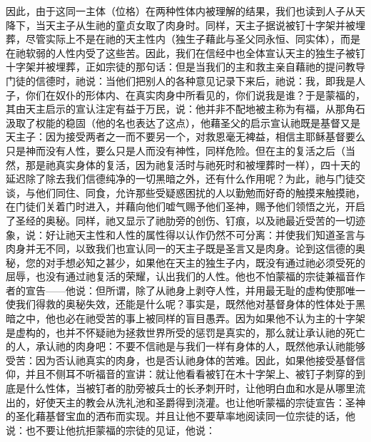 因此，由于这同一主体（位格）在两种性体内被理解的结果，我们也读到人子从天降下，当天主子从生祂的童贞女取了肉身时。同样，天主子据说被钉十字架并被埋葬，尽管实际上不是在祂的天主性内（独生子藉此与圣父同永恒、同实体），而是在祂软弱的人性内受了这些苦。因此，我们在信经中也全体宣认天主的独生子被钉十字架并被埋葬，正如宗徒的那句话：但是当我们的主和救主亲自藉祂的提问教导门徒的信德时，祂说：当他们把别人的各种意见记录下来后，祂说：我，即我是人子，你们在奴仆的形体内、在真实肉身中所看见的，你们说我是谁？于是蒙福的，其由天主启示的宣认注定有益于万民，说：他并非不配地被主称为有福，从那角石汲取了权能的稳固（他的名也表达了这点），他藉圣父的启示宣认祂既是基督又是天主子：因为接受两者之一而不要另一个，对救恩毫无裨益，相信主耶稣基督要么只是神而没有人性，要么只是人而没有神性，同样危险。但在主的复活之后（当然，那是祂真实身体的复活，因为祂复活时与祂死时和被埋葬时一样），四十天的延迟除了除去我们信德纯净的一切黑暗之外，还有什么作用呢？为此，祂与门徒交谈，与他们同住、同食，允许那些受疑惑困扰的人以勤勉而好奇的触摸来触摸祂，在门徒们关着门时进入，并藉向他们嘘气赐予他们圣神，赐予他们领悟之光，开启了圣经的奥秘。同样，祂又显示了祂肋旁的创伤、钉痕，以及祂最近受苦的一切迹象，说：好让祂天主性和人性的属性得以认作仍然不可分离：并使我们知道圣言与肉身并无不同，以致我们也宣认同一的天主子既是圣言又是肉身。论到这信德的奥秘，您的对手想必知之甚少，如果他在天主的独生子内，既没有通过祂必须受死的屈辱，也没有通过祂复活的荣耀，认出我们的人性。他也不怕蒙福的宗徒兼福音作者的宣告——他说：但所谓，除了从祂身上剥夺人性，并用最无耻的虚构使那唯一使我们得救的奥秘失效，还能是什么呢？事实是，既然他对基督身体的性体处于黑暗之中，他也必在祂受苦的事上被同样的盲目愚弄。因为如果他不认为主的十字架是虚构的，也并不怀疑祂为拯救世界所受的惩罚是真实的，那么就让承认祂的死亡的人，承认祂的肉身吧：不要不信祂是与我们一样有身体的人，既然他承认祂能够受苦：因为否认祂真实的肉身，也是否认祂身体的苦难。因此，如果他接受基督信仰，并且不侧耳不听福音的宣讲：就让他看看被钉在木十字架上、被钉子刺穿的到底是什么性体，当被钉者的肋旁被兵士的长矛刺开时，让他明白血和水是从哪里流出的，好使天主的教会从洗礼池和圣爵得到浇灌。也让他听蒙福的宗徒宣告：圣神的圣化藉基督宝血的洒布而实现。并且让他不要草率地阅读同一位宗徒的话，他说：也不要让他抗拒蒙福的宗徒的见证，他说：\Bibl